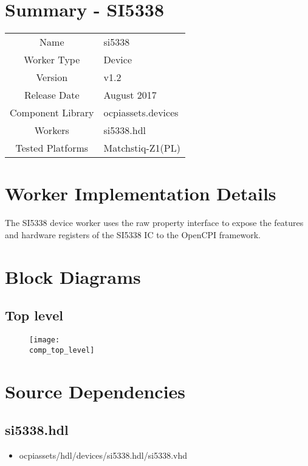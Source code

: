 \documentclass{article}
\author{} %
\date{Version \docVersion} %
\title{\docTitle}
\def\docVersion{1.2}
\def\comp{si5338}
\def\Comp{SI5338}
\begin{document}
\section*{Summary - \Comp}
\begin{tabular}{|c|M{13.5cm}|}
	\hline
	                  &                                        \\
	\hline
	Name              & \comp                                  \\
	\hline
	Worker Type       & Device                                 \\
	\hline
	Version           & v\docVersion \\
	\hline
	Release Date      & August 2017 \\
	\hline
	Component Library & ocpiassets.devices                     \\
	\hline
	Workers           & \comp.hdl                              \\
	\hline
	Tested Platforms  & Matchstiq-Z1(PL)                       \\
	\hline
\end{tabular}

\section*{Worker Implementation Details}
The \Comp{} device worker uses the raw property interface to expose the features and hardware registers of the \Comp{} IC to the OpenCPI framework.

\section*{Block Diagrams}
\subsection*{Top level}
\begin{figure}[ht]
	\centerline{\texttt{[image: \\comp\_top\_level]}}
	\label{fig:tb}
\end{figure}

\section*{Source Dependencies}
\subsection*{\comp.hdl}
\begin{itemize}
	\item ocpiassets/hdl/devices/\comp.hdl/\comp.vhd
\end{itemize}
\end{document}
